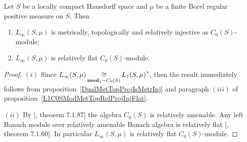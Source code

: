 \begin{proposition}\label{LinftyC0SModMetTopRelProjIngFlat} Let $S$ be a locally
compact Hausdorff space and $\mu$ be a finite Borel regular positive measure on
$S$. Then

\begin{enumerate}[label = (\roman*)]
    \item $L_\infty(S,\mu)$ is metrically, topologically and relatively 
    injective as $C_0(S)$-module;

    \item $L_\infty(S,\mu)$ is relatively flat $C_0(S)$-module.
\end{enumerate}
\end{proposition}
\begin{proof} $(i)$ Since
$L_\infty(S,\mu)\mathop{\mathbin{\cong}}\limits_{\mathbf{mod}_1-C_0(S)}{L_1(S,\mu)}^*$, then the result
immediately follows from proposition~\ref{DualMetTopProjIsMetrInj} and paragraph
$(iii)$ of proposition~\ref{L1C0SModMetTopRelProjInjFlat}.

$(ii)$ By [\cite{HelBanLocConvAlg}, theorem 7.1.87] the algebra $C_0(S)$ is
relatively amenable. Any left Banach module over relatively amenable Banach
algebra is relatively flat [\cite{HelBanLocConvAlg}, theorem 7.1.60]. In
particular $L_\infty(S,\mu)$ is relatively flat $C_0(S)$-module.
\end{proof}

